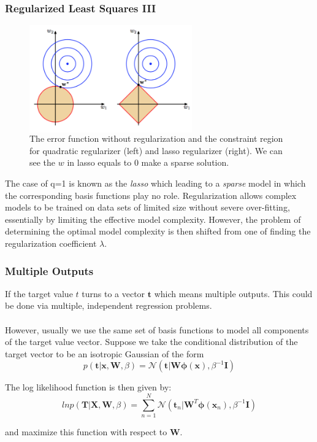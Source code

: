 \documentclass{beamer}
\begin{document}
\begin{frame}
\frametitle{Regularized Least Squares III}


\begin{figure}
\begin{columns}
\includegraphics[width=7cm]{Figure4}
\caption{The  error function without regularization and the constraint region for quadratic regularizer (left) and lasso regularizer (right). We can see the $w$ in lasso equals to 0 make a sparse solution.}
\label{Figure4}
\end{columns}
\end{figure}


The case of q=1 is known as the \textit{lasso} which leading to a \textit{sparse} model in which the corresponding basis functions play no role.
Regularization allows complex models to be trained on data sets of limited size without severe over-fitting, essentially by limiting the effective model complexity. However, the problem of determining the optimal model complexity is then shifted from one of finding the regularization coefficient $\lambda$.
\end{frame}


\begin{frame}
\frametitle{Multiple Outputs}
If the target value $t$ turns to a vector $\bm{t}$ which means multiple outputs. This could be done via multiple, independent regression problems.\\~\\

However, usually we use the same set of basis functions to model all components of the target value vector. Suppose we take the conditional distribution of the target vector to be an isotropic Gaussian of the form
\begin{equation}
p(\bm{t}|\bm{x},\bm{W},\beta)=\mathcal{N}(\bm{t}|\bm{W}\bm{\phi}(\bm{x}),\beta^{-1}\bm{I})
\end{equation}

The log likelihood function is then given by:
\begin{equation}
ln p(\bm{T}|\bm{X},\bm{W},\beta) = \sum_{n=1}^{N}\mathcal{N}(\bm{t}_n|\bm{W}^T \bm{\phi}(\bm{x}_n),\beta^{-1}\bm{I})
\end{equation}

and maximize this function with respect to $\bm{W}$.

\end{frame}
\end{document}
